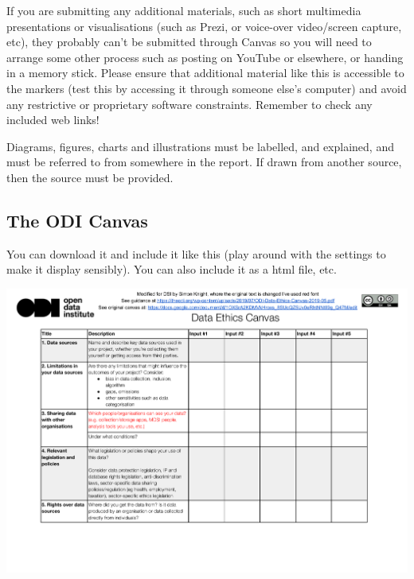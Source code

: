 \documentclass[
]{article}
\begin{document}
If you are submitting any additional materials, such as short multimedia
presentations or visualisations (such as Prezi, or voice-over
video/screen capture, etc), they probably can't be submitted through
Canvas so you will need to arrange some other process such as posting on
YouTube or elsewhere, or handing in a memory stick. Please ensure that
additional material like this is accessible to the markers (test this by
accessing it through someone else's computer) and avoid any restrictive
or proprietary software constraints. Remember to check any included web
links!

Diagrams, figures, charts and illustrations must be labelled, and
explained, and must be referred to from somewhere in the report. If
drawn from another source, then the source must be provided.

\hypertarget{the-odi-canvas}{%
\subsection{The ODI Canvas}\label{the-odi-canvas}}

You can download it and include it like this (play around with the
settings to make it display sensibly). You can also include it as a html
file, etc.

\includegraphics[width=1\linewidth]{DSI_copy_ODI_Data_Ethics_Canvas}
\end{document}
